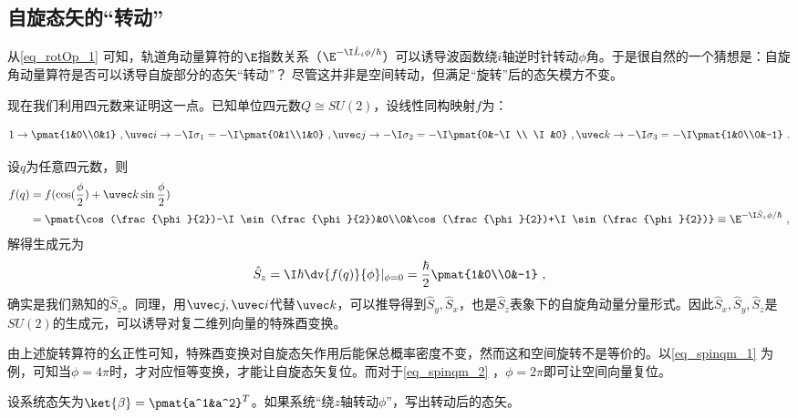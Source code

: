 \subsection{自旋态矢的“转动”}

从\autoref{eq_rotOp_1} 可知，轨道角动量算符的$\E$指数关系（$\E^{-\I \hat L_i\phi/\hbar}$）可以诱导波函数绕$i$轴逆时针转动$\phi$角。于是很自然的一个猜想是：自旋角动量算符是否可以诱导自旋部分的态矢“转动”？ 尽管这并非是空间转动，但满足“旋转”后的态矢模方不变。

现在我们利用四元数来证明这一点。已知单位四元数$Q\cong SU(2)$，设线性同构映射$f$为：

\begin{equation}
1\rightarrow\pmat{1&0\\0&1}~,\uvec i\rightarrow-\I\sigma_1=-\I\pmat{0&1\\1&0}~,\uvec j\rightarrow -\I\sigma_2=-\I\pmat{0&-\I\\ \I&0}~,\uvec k\rightarrow -\I\sigma_3=-\I\pmat{1&0\\0&-1}~.
\end{equation}

设$q$为任意四元数，则
\begin{equation}\label{eq_spinqm_1}
\begin{aligned}
f(q)&=f(\cos(\frac{\phi}{2})+\uvec k \sin\frac{\phi}{2})\\
&=\pmat{\cos(\frac{\phi}{2})-\I \sin (\frac{\phi}{2})&0\\0&\cos(\frac{\phi}{2})+\I\sin (\frac{\phi}{2})}\equiv\E^{-\I \hat S_z \phi /\hbar}~,
\end{aligned}
\end{equation}
解得生成元为
\begin{equation}
\hat S_z=\I\hbar \dv{f(q)}{\phi}|_{\phi=0}=\frac{\hbar}{2}\pmat{1&0\\0&-1}~,
\end{equation}
确实是我们熟知的$\hat S_z$。同理，用$\uvec j,\uvec i$代替$\uvec k$，可以推导得到$\hat S_y,\hat S_x$，也是$\hat S_z$表象下的自旋角动量分量形式。因此$\hat S_x,\hat S_y,\hat S_z$是$SU(2)$的生成元，可以诱导对复二维列向量的特殊酉变换。

由上述旋转算符的幺正性可知，特殊酉变换对自旋态矢作用后能保总概率密度不变，然而这和空间旋转不是等价的。以\autoref{eq_spinqm_1} 为例，可知当$\phi=4\pi$时，才对应恒等变换，才能让自旋态矢复位。而对于\autoref{eq_spinqm_2} ，$\phi=2\pi$即可让空间向量复位。
\begin{exercise}{}
设系统态矢为$\ket{\beta}=\pmat{a^1&a^2}^T$。如果系统“绕$z$轴转动$\phi$”，写出转动后的态矢。
\end{exercise}
